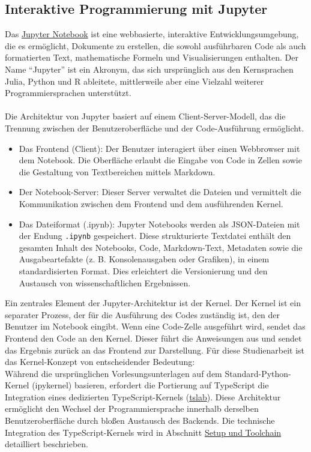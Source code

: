 \subsection{Interaktive Programmierung mit Jupyter}
Das \href{https://jupyter.org/}{Jupyter Notebook} ist eine webbasierte, interaktive Entwicklungsumgebung, die es ermöglicht, Dokumente zu erstellen, die sowohl ausführbaren Code als auch formatierten Text, mathematische Formeln und Visualisierungen enthalten. Der Name \enquote{Jupyter} ist ein Akronym, das sich ursprünglich aus den Kernsprachen Julia, Python und R ableitete, mittlerweile aber eine Vielzahl weiterer Programmiersprachen unterstützt.\\ \\
Die Architektur von Jupyter basiert auf einem Client-Server-Modell, das die Trennung zwischen der Benutzeroberfläche und der Code-Ausführung ermöglicht.
\begin{itemize}
	\item Das Frontend (Client): Der Benutzer interagiert über einen Webbrowser mit dem Notebook. Die Oberfläche erlaubt die Eingabe von Code in Zellen sowie die Gestaltung von Textbereichen mittels Markdown.
	\item Der Notebook-Server: Dieser Server verwaltet die Dateien und vermittelt die Kommunikation zwischen dem Frontend und dem ausführenden Kernel.
	\item Das Dateiformat (.ipynb): Jupyter Notebooks werden als \ac{JSON}-Dateien mit der Endung \texttt{.ipynb} gespeichert. Diese strukturierte Textdatei enthält den gesamten Inhalt des Notebooks, Code, Markdown-Text, Metadaten sowie die Ausgabeartefakte (z. B. Konsolenausgaben oder Grafiken), in einem standardisierten Format. Dies erleichtert die Versionierung und den Austausch von wissenschaftlichen Ergebnissen.
\end{itemize}
Ein zentrales Element der Jupyter-Architektur ist der Kernel. Der Kernel ist ein separater Prozess, der für die Ausführung des Codes zuständig ist, den der Benutzer im Notebook eingibt. Wenn eine Code-Zelle ausgeführt wird, sendet das Frontend den Code an den Kernel. Dieser führt die Anweisungen aus und sendet das Ergebnis zurück an das Frontend zur Darstellung.
Für diese Studienarbeit ist das Kernel-Konzept von entscheidender Bedeutung:\\
Während die ursprünglichen Vorlesungsunterlagen auf dem Standard-Python-Kernel (ipykernel) basieren, erfordert die Portierung auf TypeScript die Integration eines dedizierten TypeScript-Kernels (\href{https://github.com/yunabe/tslab}{tslab}). Diese Architektur ermöglicht den Wechsel der Programmiersprache innerhalb derselben Benutzeroberfläche durch bloßen Austausch des Backends. Die technische Integration des TypeScript-Kernels wird in Abschnitt \hyperref[sec:setup]{Setup und Toolchain} detailliert beschrieben.




